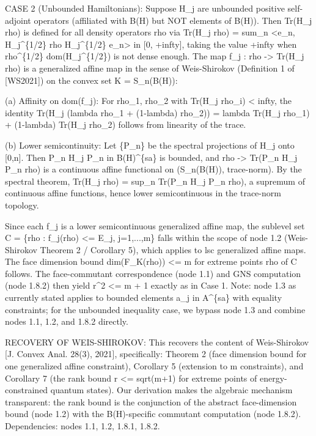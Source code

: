 \documentclass{article}
\begin{document}
\begin{enumerate}
\begin{enumerate}
CASE 2 (Unbounded Hamiltonians): Suppose H\_j are unbounded positive self-adjoint operators (affiliated with B(H) but NOT elements of B(H)). Then Tr(H\_j rho) is defined for all density operators rho via Tr(H\_j rho) = sum\_n <e\_n, H\_j\textasciicircum{}\{1/2\} rho H\_j\textasciicircum{}\{1/2\} e\_n> in [0, +infty], taking the value +infty when rho\textasciicircum{}\{1/2\} dom(H\_j\textasciicircum{}\{1/2\}) is not dense enough. The map f\_j : rho -> Tr(H\_j rho) is a generalized affine map in the sense of Weis-Shirokov (Definition 1 of [WS2021]) on the convex set K = S\_n(B(H)):

(a) Affinity on dom(f\_j): For rho\_1, rho\_2 with Tr(H\_j rho\_i) < infty, the identity Tr(H\_j (lambda rho\_1 + (1-lambda) rho\_2)) = lambda Tr(H\_j rho\_1) + (1-lambda) Tr(H\_j rho\_2) follows from linearity of the trace.

(b) Lower semicontinuity: Let \{P\_n\} be the spectral projections of H\_j onto [0,n]. Then P\_n H\_j P\_n in B(H)\textasciicircum{}\{sa\} is bounded, and rho -> Tr(P\_n H\_j P\_n rho) is a continuous affine functional on (S\_n(B(H)), trace-norm). By the spectral theorem, Tr(H\_j rho) = sup\_n Tr(P\_n H\_j P\_n rho), a supremum of continuous affine functions, hence lower semicontinuous in the trace-norm topology.

Since each f\_j is a lower semicontinuous generalized affine map, the sublevel set C = \{rho : f\_j(rho) <= E\_j, j=1,...,m\} falls within the scope of node 1.2 (Weis-Shirokov Theorem 2 / Corollary 5), which applies to lsc generalized affine maps. The face dimension bound dim(F\_K(rho)) <= m for extreme points rho of C follows. The face-commutant correspondence (node 1.1) and GNS computation (node 1.8.2) then yield r\textasciicircum{}2 <= m + 1 exactly as in Case 1. Note: node 1.3 as currently stated applies to bounded elements a\_j in A\textasciicircum{}\{sa\} with equality constraints; for the unbounded inequality case, we bypass node 1.3 and combine nodes 1.1, 1.2, and 1.8.2 directly.

RECOVERY OF WEIS-SHIROKOV: This recovers the content of Weis-Shirokov [J. Convex Anal. 28(3), 2021], specifically: Theorem 2 (face dimension bound for one generalized affine constraint), Corollary 5 (extension to m constraints), and Corollary 7 (the rank bound r <= sqrt(m+1) for extreme points of energy-constrained quantum states). Our derivation makes the algebraic mechanism transparent: the rank bound is the conjunction of the abstract face-dimension bound (node 1.2) with the B(H)-specific commutant computation (node 1.8.2). Dependencies: nodes 1.1, 1.2, 1.8.1, 1.8.2.


\end{enumerate}
\end{enumerate}
\end{document}
